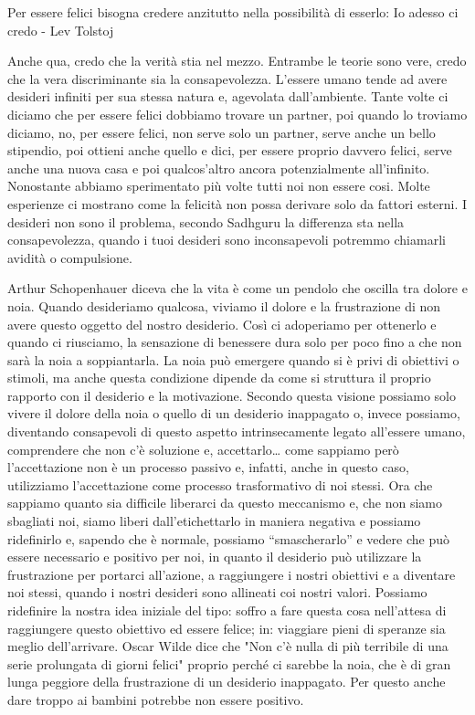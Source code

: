 \documentclass[12pt]{book} %
\begin{document}
Per essere felici bisogna credere anzitutto nella possibilità di esserlo: Io adesso ci credo - Lev Tolstoj 

Anche qua, credo che la verità stia nel mezzo. Entrambe le teorie sono vere, credo che la vera discriminante sia la
consapevolezza. L'essere umano tende ad avere desideri infiniti per sua stessa natura e, agevolata
dall'ambiente. Tante volte ci diciamo che per essere felici dobbiamo trovare un partner, poi
quando lo troviamo diciamo, no, per essere felici, non serve solo un partner, serve anche un bello stipendio, poi
ottieni anche quello e dici, per essere proprio davvero felici, serve anche una nuova casa e poi
qualcos'altro ancora potenzialmente all'infinito. Nonostante abbiamo sperimentato più
volte tutti noi non essere cosi. Molte esperienze ci mostrano come la felicità non possa derivare solo da fattori esterni. I desideri non sono il problema, secondo Sadhguru la differenza sta nella consapevolezza, quando i tuoi
desideri sono inconsapevoli potremmo chiamarli avidità o compulsione. 

Arthur Schopenhauer diceva che la vita è come un pendolo che oscilla tra dolore e noia.
Quando desideriamo qualcosa, viviamo il dolore e la frustrazione di non avere questo oggetto del nostro desiderio. Così
ci adoperiamo per ottenerlo e quando ci riusciamo, la sensazione di benessere dura solo per poco fino a che non sarà la noia a soppiantarla. La noia può emergere quando si è privi di obiettivi o stimoli, ma anche questa condizione dipende da come si struttura il proprio rapporto con il desiderio e la motivazione.
Secondo questa visione possiamo solo vivere il dolore della noia o quello di un desiderio inappagato o, invece
possiamo, diventando consapevoli di questo aspetto intrinsecamente legato all'essere umano, 
comprendere che non c'è soluzione e, accettarlo… come sappiamo però
l'accettazione non è un processo passivo e, infatti, anche in questo caso, utilizziamo
l'accettazione come processo trasformativo di noi stessi. Ora che sappiamo quanto sia difficile
liberarci da questo meccanismo e, che non siamo sbagliati noi, siamo liberi dall'etichettarlo in
maniera negativa e possiamo ridefinirlo e, sapendo che è normale, possiamo “smascherarlo” e vedere che può essere necessario e
positivo per noi, in quanto il desiderio può utilizzare la frustrazione per portarci all'azione, a
raggiungere i nostri obiettivi e a diventare noi stessi, quando i nostri desideri sono allineati coi nostri valori. Possiamo ridefinire la nostra idea iniziale del tipo: soffro a fare questa cosa
nell'attesa di raggiungere questo obiettivo ed essere felice; in: viaggiare pieni di speranze sia
meglio dell'arrivare. Oscar Wilde dice che "Non c'è nulla di più terribile di
una serie prolungata di giorni felici" proprio perché ci sarebbe la noia, che è di gran lunga
peggiore della frustrazione di un desiderio inappagato. Per questo anche dare troppo ai bambini potrebbe non essere
positivo.
\end{document}
